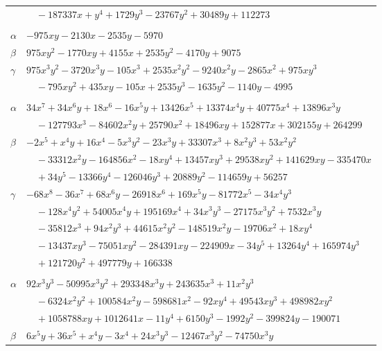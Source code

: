 \documentclass[11pt]{article}
\begin{document}
\begin{longtable}{@{}ll@{}}
 & $\quad -187337x+y^{4}+1729y^{3}-23767y^{2}+30489y+112273$\\
\addlinespace[3pt]
\multicolumn{2}{@{}l}{$\{i,j\}=\{32,107\}$, $k_{ij}=2^{5}\cdot 3^{3}\cdot 5$}\\
$\alpha$ & $-975xy-2130x-2535y-5970$\\
$\beta$ & $975xy^{2}-1770xy+4155x+2535y^{2}-4170y+9075$\\
$\gamma$ & $975x^{3}y^{2}-3720x^{3}y-105x^{3}+2535x^{2}y^{2}-9240x^{2}y-2865x^{2}+975xy^{3}$\\
 & $\quad -795xy^{2}+435xy-105x+2535y^{3}-1635y^{2}-1140y-4995$\\
\addlinespace[3pt]
\multicolumn{2}{@{}l}{$\{i,j\}=\{32,117\}$, $k_{ij}=2^{8}\cdot 3^{3}\cdot 7\cdot 13$}\\
$\alpha$ & $34x^{7}+34x^{6}y+18x^{6}-16x^{5}y+13426x^{5}+13374x^{4}y+40775x^{4}+13896x^{3}y$\\
 & $\quad -127793x^{3}-84602x^{2}y+25790x^{2}+18496xy+152877x+302155y+264299$\\
$\beta$ & $-2x^{5}+x^{4}y+16x^{4}-5x^{3}y^{2}-23x^{3}y+33307x^{3}+8x^{2}y^{3}+53x^{2}y^{2}$\\
 & $\quad -33312x^{2}y-164856x^{2}-18xy^{4}+13457xy^{3}+29538xy^{2}+141629xy-335470x$\\
 & $\quad +34y^{5}-13366y^{4}-126046y^{3}+20889y^{2}-114659y+56257$\\
$\gamma$ & $-68x^{8}-36x^{7}+68x^{6}y-26918x^{6}+169x^{5}y-81772x^{5}-34x^{4}y^{3}$\\
 & $\quad -128x^{4}y^{2}+54005x^{4}y+195169x^{4}+34x^{3}y^{3}-27175x^{3}y^{2}+7532x^{3}y$\\
 & $\quad -35812x^{3}+94x^{2}y^{3}+44615x^{2}y^{2}-148519x^{2}y-19706x^{2}+18xy^{4}$\\
 & $\quad -13437xy^{3}-75051xy^{2}-284391xy-224909x-34y^{5}+13264y^{4}+165974y^{3}$\\
 & $\quad +121720y^{2}+497779y+166338$\\
\addlinespace[3pt]
\multicolumn{2}{@{}l}{$\{i,j\}=\{32,153\}$, $k_{ij}=2^{6}\cdot 3^{2}\cdot 5^{2}\cdot 7\cdot 13$}\\
$\alpha$ & $92x^{3}y^{3}-50995x^{3}y^{2}+293348x^{3}y+243635x^{3}+11x^{2}y^{3}$\\
 & $\quad -6324x^{2}y^{2}+100584x^{2}y-598681x^{2}-92xy^{4}+49543xy^{3}+498982xy^{2}$\\
 & $\quad +1058788xy+1012641x-11y^{4}+6150y^{3}-1992y^{2}-399824y-190071$\\
$\beta$ & $6x^{5}y+36x^{5}+x^{4}y-3x^{4}+24x^{3}y^{3}-12467x^{3}y^{2}-74750x^{3}y$\\

\end{longtable}
\end{document}
